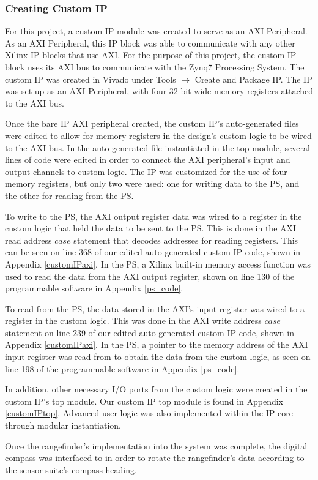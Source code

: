 \subsubsection{Creating Custom IP} \label{sssec:creatingCustomIP}
For this project, a custom IP module was created to serve as an AXI Peripheral. As an AXI Peripheral, this IP block was able to communicate with any other Xilinx IP blocks that use AXI. For the purpose of this project, the custom IP block uses its AXI bus to communicate with the Zynq7 Processing System. The custom IP was created in Vivado under Tools $\rightarrow$ Create and Package IP. The IP was set up as an AXI Peripheral, with four 32-bit wide memory registers attached to the AXI bus.
\par
Once the bare IP AXI peripheral created, the custom IP's auto-generated files were edited to allow for memory registers in the design's custom logic to be wired to the AXI bus. In the auto-generated file instantiated in the top module, several lines of code were edited in order to connect the AXI peripheral's input and output channels to custom logic. The IP was customized for the use of four memory registers, but only two were used: one for writing data to the PS, and the other for reading from the PS. 
\par
To write to the PS, the AXI output register data was wired to a register in the custom logic that held the data to be sent to the PS. This is done in the AXI read address $case$ statement that decodes addresses for reading registers. This can be seen on line 368 of our edited auto-generated custom IP code, shown in Appendix \ref{customIPaxi}. In the PS, a Xilinx built-in memory access function was used to read the data from the AXI output register, shown on line 130 of the programmable software in Appendix \ref{ps_code}.
\par
To read from the PS, the data stored in the AXI's input register was wired to a register in the custom logic. This was done in the AXI write address $case$ statement on line 239 of our edited auto-generated custom IP code, shown in Appendix \ref{customIPaxi}. In the PS, a pointer to the memory address of the AXI input register was read from to obtain the data from the custom logic, as seen on line 198 of the programmable software in Appendix \ref{ps_code}.
\par
In addition, other necessary I/O ports from the custom logic were created in the custom IP's top module. Our custom IP top module is found in Appendix \ref{customIPtop}. Advanced user logic was also implemented within the IP core through modular instantiation.
\par
Once the rangefinder's implementation into the system was complete, the digital compass was interfaced to in order to rotate the rangefinder's data according to the sensor suite's compass heading.

